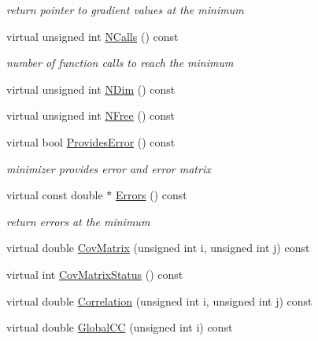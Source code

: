 \begin{DoxyCompactItemize}
\begin{DoxyCompactList}\small\item\em return pointer to gradient values at the minimum \end{DoxyCompactList}\item 
virtual unsigned int \mbox{\hyperlink{classROOT_1_1Minuit2_1_1Minuit2Minimizer_ab5faf7c3dc0b3743eee8352c62a6ccfd}{N\+Calls}} () const
\begin{DoxyCompactList}\small\item\em number of function calls to reach the minimum \end{DoxyCompactList}\item 
virtual unsigned int \mbox{\hyperlink{classROOT_1_1Minuit2_1_1Minuit2Minimizer_a6ed2c7d99296e222f0f43295e302eb9e}{N\+Dim}} () const
\item 
virtual unsigned int \mbox{\hyperlink{classROOT_1_1Minuit2_1_1Minuit2Minimizer_a0aa136c5a94d1e5c6bfcbfb98da7ad2d}{N\+Free}} () const
\item 
virtual bool \mbox{\hyperlink{classROOT_1_1Minuit2_1_1Minuit2Minimizer_a3a3a8abea38285fe639f2f0ec5505533}{Provides\+Error}} () const
\begin{DoxyCompactList}\small\item\em minimizer provides error and error matrix \end{DoxyCompactList}\item 
virtual const double $\ast$ \mbox{\hyperlink{classROOT_1_1Minuit2_1_1Minuit2Minimizer_a69c6dd9654ce41856814b358570cb9d7}{Errors}} () const
\begin{DoxyCompactList}\small\item\em return errors at the minimum \end{DoxyCompactList}\item 
virtual double \mbox{\hyperlink{classROOT_1_1Minuit2_1_1Minuit2Minimizer_a6ba10de01ab6e7228fa4908894de5619}{Cov\+Matrix}} (unsigned int i, unsigned int j) const
\item 
virtual int \mbox{\hyperlink{classROOT_1_1Minuit2_1_1Minuit2Minimizer_ad9f4873b9651626d2b83cf7eab826b0f}{Cov\+Matrix\+Status}} () const
\item 
virtual double \mbox{\hyperlink{classROOT_1_1Minuit2_1_1Minuit2Minimizer_a229e82025189e72b5a03cb4e3be19f4a}{Correlation}} (unsigned int i, unsigned int j) const
\item 
virtual double \mbox{\hyperlink{classROOT_1_1Minuit2_1_1Minuit2Minimizer_adde21edb0a67e0eef950049528cfb9a7}{Global\+CC}} (unsigned int i) const
\item 

\end{DoxyCompactItemize}
